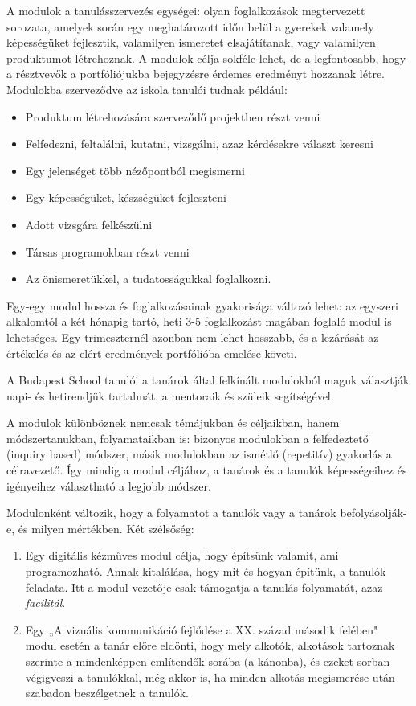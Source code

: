 A modulok a tanulásszervezés egységei: olyan foglalkozások megtervezett sorozata, amelyek során egy meghatározott időn belül a gyerekek valamely képességüket fejlesztik, valamilyen ismeretet elsajátítanak, vagy valamilyen produktumot létrehoznak. A modulok célja sokféle lehet, de a legfontosabb, hogy a résztvevők a portfóliójukba bejegyzésre érdemes eredményt hozzanak létre. Modulokba szerveződve az iskola tanulói tudnak például:
\begin{itemize}
\item Produktum létrehozására szerveződő projektben részt venni

\item Felfedezni, feltalálni, kutatni, vizsgálni, azaz kérdésekre választ keresni

\item Egy jelenséget több nézőpontból megismerni

\item Egy képességüket, készségüket fejleszteni

\item Adott vizsgára felkészülni

\item Társas programokban részt venni

\item Az önismeretükkel, a tudatosságukkal foglalkozni.
\end{itemize}

Egy-egy modul hossza és foglalkozásainak gyakorisága változó lehet: az egyszeri alkalomtól a két hónapig tartó, heti 3-5 foglalkozást magában foglaló modul is lehetséges. Egy trimeszternél azonban nem lehet hosszabb, és a lezárását az értékelés és az elért eredmények portfólióba emelése követi.

A Budapest School tanulói a tanárok által felkínált modulokból maguk választják napi- és hetirendjük tartalmát, a mentoraik és szüleik segítségével.

A modulok különböznek nemcsak témájukban és céljaikban, hanem módszertanukban, folyamataikban is: bizonyos modulokban a felfedeztető (inquiry based) módszer, másik modulokban az ismétlő (repetitív) gyakorlás a célravezető. Így mindig a modul céljához, a tanárok és a tanulók képességeihez és igényeihez választható a legjobb módszer.

Modulonként változik, hogy a folyamatot a tanulók vagy a tanárok befolyásolják-e, és milyen mértékben. Két szélsőség:
\begin{enumerate}
\item Egy digitális kézműves modul célja, hogy építsünk valamit, ami programozható. Annak kitalálása, hogy mit és hogyan építünk, a tanulók feladata. Itt a modul vezetője csak támogatja a tanulás folyamatát, azaz \emph{facilitál}.

\item Egy „A vizuális kommunikáció fejlődése a XX. század második felében" modul esetén a tanár előre eldönti, hogy mely alkotók, alkotások tartoznak szerinte a mindenképpen említendők sorába (a kánonba), és ezeket sorban végigveszi a tanulókkal, még akkor is, ha minden alkotás megismerése után szabadon beszélgetnek a tanulók.
\end{enumerate}

